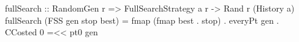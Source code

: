 fullSearch :: RandomGen r => FullSearchStrategy a r -> Rand r (History a)
fullSearch (FSS gen stop best) =
  fmap (fmap best . stop) . everyPt gen . CCosted 0 =<< pt0 gen
